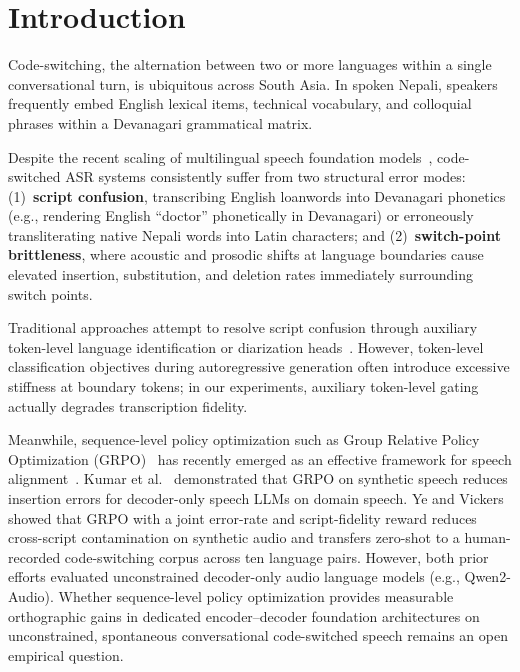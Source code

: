\documentclass[10pt,twocolumn,a4paper]{article}
\begin{document}
\section{Introduction}
Code-switching, the alternation between two or more languages within a single conversational turn, is ubiquitous across South Asia. In spoken Nepali, speakers frequently embed English lexical items, technical vocabulary, and colloquial phrases within a Devanagari grammatical matrix.

Despite the recent scaling of multilingual speech foundation models~\cite{canary2025,indic_transcribe_flex}, code-switched ASR systems consistently suffer from two structural error modes: (1)~\textbf{script confusion}, transcribing English loanwords into Devanagari phonetics (e.g., rendering English ``doctor'' phonetically in Devanagari) or erroneously transliterating native Nepali words into Latin characters; and (2)~\textbf{switch-point brittleness}, where acoustic and prosodic shifts at language boundaries cause elevated insertion, substitution, and deletion rates immediately surrounding switch points.

Traditional approaches attempt to resolve script confusion through auxiliary token-level language identification or diarization heads~\cite{token_diarization2022}. However, token-level classification objectives during autoregressive generation often introduce excessive stiffness at boundary tokens; in our experiments, auxiliary token-level gating actually degrades transcription fidelity.

Meanwhile, sequence-level policy optimization such as Group Relative Policy Optimization (GRPO)~\cite{shao2024deepseekmath} has recently emerged as an effective framework for speech alignment~\cite{amazon_grpo2025}. Kumar et al.~\cite{synthetic_grpo2026} demonstrated that GRPO on synthetic speech reduces insertion errors for decoder-only speech LLMs on domain speech. Ye and Vickers~\cite{ye_vickers2026} showed that GRPO with a joint error-rate and script-fidelity reward reduces cross-script contamination on synthetic audio and transfers zero-shot to a human-recorded code-switching corpus across ten language pairs. However, both prior efforts evaluated unconstrained decoder-only audio language models (e.g., Qwen2-Audio). Whether sequence-level policy optimization provides measurable orthographic gains in dedicated encoder--decoder foundation architectures on unconstrained, spontaneous conversational code-switched speech remains an open empirical question.
\end{document}
